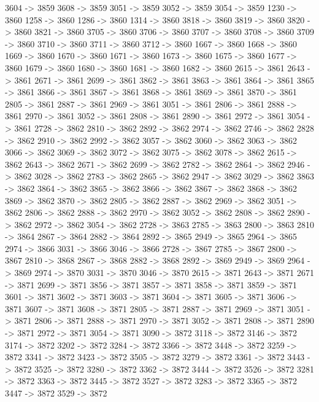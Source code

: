 {	3604 -> 3859
	3608 -> 3859
	3051 -> 3859
	3052 -> 3859
	3054 -> 3859
	1230 -> 3860
	1258 -> 3860
	1286 -> 3860
	1314 -> 3860
	3818 -> 3860
	3819 -> 3860
	3820 -> 3860
	3821 -> 3860
	3705 -> 3860
	3706 -> 3860
	3707 -> 3860
	3708 -> 3860
	3709 -> 3860
	3710 -> 3860
	3711 -> 3860
	3712 -> 3860
	1667 -> 3860
	1668 -> 3860
	1669 -> 3860
	1670 -> 3860
	1671 -> 3860
	1673 -> 3860
	1675 -> 3860
	1677 -> 3860
	1679 -> 3860
	1680 -> 3860
	1681 -> 3860
	1682 -> 3860
	2615 -> 3861
	2643 -> 3861
	2671 -> 3861
	2699 -> 3861
	3862 -> 3861
	3863 -> 3861
	3864 -> 3861
	3865 -> 3861
	3866 -> 3861
	3867 -> 3861
	3868 -> 3861
	3869 -> 3861
	3870 -> 3861
	2805 -> 3861
	2887 -> 3861
	2969 -> 3861
	3051 -> 3861
	2806 -> 3861
	2888 -> 3861
	2970 -> 3861
	3052 -> 3861
	2808 -> 3861
	2890 -> 3861
	2972 -> 3861
	3054 -> 3861
	2728 -> 3862
	2810 -> 3862
	2892 -> 3862
	2974 -> 3862
	2746 -> 3862
	2828 -> 3862
	2910 -> 3862
	2992 -> 3862
	3057 -> 3862
	3060 -> 3862
	3063 -> 3862
	3066 -> 3862
	3069 -> 3862
	3072 -> 3862
	3075 -> 3862
	3078 -> 3862
	2615 -> 3862
	2643 -> 3862
	2671 -> 3862
	2699 -> 3862
	2782 -> 3862
	2864 -> 3862
	2946 -> 3862
	3028 -> 3862
	2783 -> 3862
	2865 -> 3862
	2947 -> 3862
	3029 -> 3862
	3863 -> 3862
	3864 -> 3862
	3865 -> 3862
	3866 -> 3862
	3867 -> 3862
	3868 -> 3862
	3869 -> 3862
	3870 -> 3862
	2805 -> 3862
	2887 -> 3862
	2969 -> 3862
	3051 -> 3862
	2806 -> 3862
	2888 -> 3862
	2970 -> 3862
	3052 -> 3862
	2808 -> 3862
	2890 -> 3862
	2972 -> 3862
	3054 -> 3862
	2728 -> 3863
	2785 -> 3863
	2800 -> 3863
	2810 -> 3864
	2867 -> 3864
	2882 -> 3864
	2892 -> 3865
	2949 -> 3865
	2964 -> 3865
	2974 -> 3866
	3031 -> 3866
	3046 -> 3866
	2728 -> 3867
	2785 -> 3867
	2800 -> 3867
	2810 -> 3868
	2867 -> 3868
	2882 -> 3868
	2892 -> 3869
	2949 -> 3869
	2964 -> 3869
	2974 -> 3870
	3031 -> 3870
	3046 -> 3870
	2615 -> 3871
	2643 -> 3871
	2671 -> 3871
	2699 -> 3871
	3856 -> 3871
	3857 -> 3871
	3858 -> 3871
	3859 -> 3871
	3601 -> 3871
	3602 -> 3871
	3603 -> 3871
	3604 -> 3871
	3605 -> 3871
	3606 -> 3871
	3607 -> 3871
	3608 -> 3871
	2805 -> 3871
	2887 -> 3871
	2969 -> 3871
	3051 -> 3871
	2806 -> 3871
	2888 -> 3871
	2970 -> 3871
	3052 -> 3871
	2808 -> 3871
	2890 -> 3871
	2972 -> 3871
	3054 -> 3871
	3090 -> 3872
	3118 -> 3872
	3146 -> 3872
	3174 -> 3872
	3202 -> 3872
	3284 -> 3872
	3366 -> 3872
	3448 -> 3872
	3259 -> 3872
	3341 -> 3872
	3423 -> 3872
	3505 -> 3872
	3279 -> 3872
	3361 -> 3872
	3443 -> 3872
	3525 -> 3872
	3280 -> 3872
	3362 -> 3872
	3444 -> 3872
	3526 -> 3872
	3281 -> 3872
	3363 -> 3872
	3445 -> 3872
	3527 -> 3872
	3283 -> 3872
	3365 -> 3872
	3447 -> 3872
	3529 -> 3872
}

